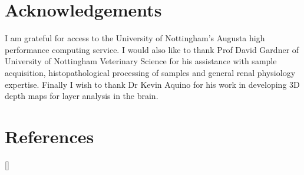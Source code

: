 \section{Acknowledgements}

I am grateful for access to the University of Nottingham's Augusta high performance computing service. I would also like to thank Prof David Gardner of University of Nottingham Veterinary Science for his assistance with sample acquisition, histopathological processing of samples and general renal physiology expertise. Finally I wish to thank Dr Kevin Aquino for his work in developing 3D depth maps for layer analysis in the brain.

\newpage
\section{References}
[\refname]{}
\printbibliography